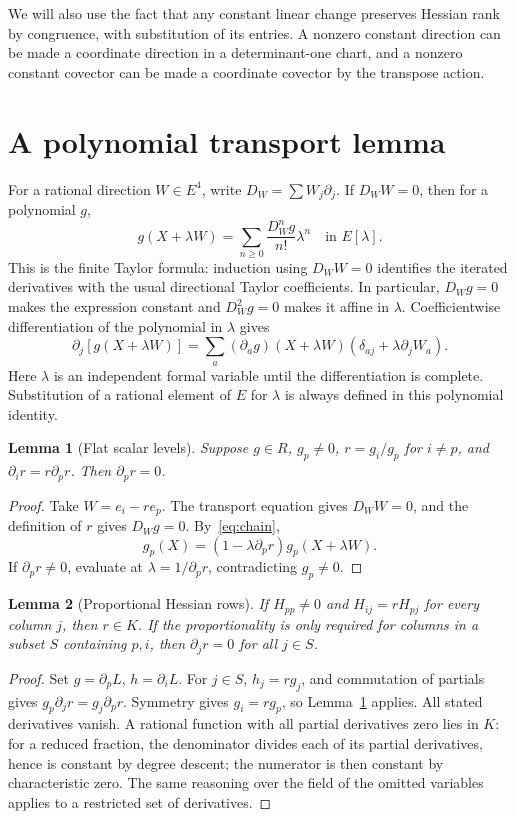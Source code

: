\documentclass[11pt,a4paper]{article}
\newtheorem{lemma}{Lemma}
\begin{document}
We will also use the fact that any constant linear change preserves Hessian rank by congruence, with substitution of its entries. A nonzero constant direction can be made a coordinate direction in a determinant-one chart, and a nonzero constant covector can be made a coordinate covector by the transpose action.

\section{A polynomial transport lemma}
For a rational direction $W\in E^4$, write $D_W=\sum W_j\partial_j$. If $D_WW=0$, then for a polynomial $g$,
\[
 g(X+\lambda W)=\sum_{n\ge0}\frac{D_W^ng}{n!}\lambda^n
 \quad\text{in }E[\lambda].
\]
This is the finite Taylor formula: induction using $D_WW=0$ identifies the iterated derivatives with the usual directional Taylor coefficients. In particular, $D_Wg=0$ makes the expression constant and $D_W^2g=0$ makes it affine in $\lambda$. Coefficientwise differentiation of the polynomial in $\lambda$ gives
\begin{equation}\label{eq:chain}
 \partial_j[g(X+\lambda W)]
 =\sum_a(\partial_a g)(X+\lambda W)
       (\delta_{aj}+\lambda\partial_j W_a).
\end{equation}
Here $\lambda$ is an independent formal variable until the differentiation is complete. Substitution of a rational element of $E$ for $\lambda$ is always defined in this polynomial identity.

\begin{lemma}[Flat scalar levels]\label{lem:flat}
Suppose $g\in R$, $g_p\ne0$, $r=g_i/g_p$ for $i\ne p$, and $\partial_i r=r\partial_p r$. Then $\partial_p r=0$.
\end{lemma}
\begin{proof}
Take $W=e_i-r e_p$. The transport equation gives $D_WW=0$, and the definition of $r$ gives $D_Wg=0$. By~\eqref{eq:chain},
\[
 g_p(X)=(1-\lambda\partial_p r)g_p(X+\lambda W).
\]
If $\partial_p r\ne0$, evaluate at $\lambda=1/\partial_p r$, contradicting $g_p\ne0$.
\end{proof}

\begin{lemma}[Proportional Hessian rows]\label{lem:rows}
If $H_{pp}\ne0$ and $H_{ij}=rH_{pj}$ for every column $j$, then $r\in K$. If the proportionality is only required for columns in a subset $S$ containing $p,i$, then $\partial_jr=0$ for all $j\in S$.
\end{lemma}
\begin{proof}
Set $g=\partial_p L$, $h=\partial_i L$. For $j\in S$, $h_j=rg_j$, and commutation of partials gives $g_p\partial_jr=g_j\partial_pr$. Symmetry gives $g_i=rg_p$, so Lemma~\ref{lem:flat} applies. All stated derivatives vanish. A rational function with all partial derivatives zero lies in $K$: for a reduced fraction, the denominator divides each of its partial derivatives, hence is constant by degree descent; the numerator is then constant by characteristic zero. The same reasoning over the field of the omitted variables applies to a restricted set of derivatives.
\end{proof}
\end{document}
